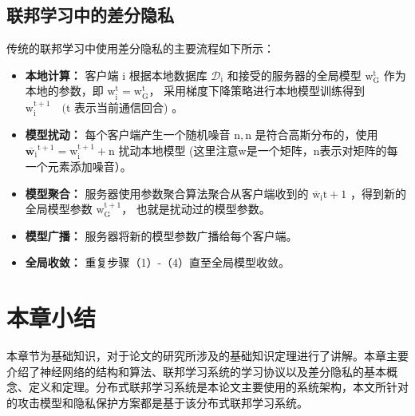 \subsection{联邦学习中的差分隐私}
传统的联邦学习中使用差分隐私的主要流程如下所示：
\begin{itemize}
\item \textbf{本地计算：}
客户端 $\mathrm{i}$ 根据本地数据库 $\mathcal{D}_{\mathrm{i}}$ 和接受的服务器的全局模型 $\mathrm{w}_{\mathrm{G}}^{\mathrm{t}}$ 作为本地的参数，即 $\mathrm{w}_{\mathrm{i}}^{\mathrm{t}}=\mathrm{w}_{\mathrm{G}}^{\mathrm{t}}$， 采用梯度下降策略进行本地模型训练得到 $\mathrm{w}_{\mathrm{i}}^{\mathrm{t}+1} \quad(\mathrm{t}$ 表示当前通信回合) 。

\item \textbf{模型扰动：}
每个客户端产生一个随机噪音 $\mathrm{n},\mathrm{n}$ 是符合高斯分布的，使用 $\overline{\mathbf{w}_{\mathrm{i}}}^{\mathrm{t}+1}=\mathrm{w}_{\mathrm{i}}^{\mathrm{t}+1}+\mathrm{n}$ 扰动本地模型 (这里注意w是一个矩阵，n表示对矩阵的每一个元素添加噪音）。

\item \textbf{模型聚合：}
服务器使用参数聚合算法聚合从客户端收到的 $\overline{\mathrm{w}}_{\mathrm{i}} \mathrm{t}+1$ ，得到新的全局模型参数 $\mathrm{w}_{\mathrm{G}}^{\mathrm{t}+1}$， 也就是扰动过的模型参数。

\item \textbf{模型广播：}
服务器将新的模型参数广播给每个客户端。

\item \textbf{全局收敛：}
重复步骤（1）-（4）直至全局模型收敛。
\end{itemize}

\section{本章小结}
本章节为基础知识，对于论文的研究所涉及的基础知识定理进行了讲解。本章主要介绍了神经网络的结构和算法、联邦学习系统的学习协议以及差分隐私的基本概念、定义和定理。分布式联邦学习系统是本论文主要使用的系统架构，本文所针对的攻击模型和隐私保护方案都是基于该分布式联邦学习系统。
